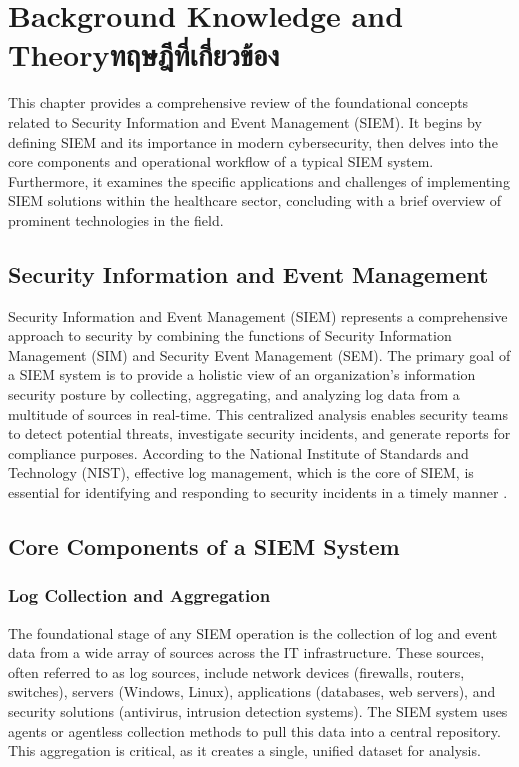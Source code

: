 \chapter{\ifenglish Background Knowledge and Theory\else ทฤษฎีที่เกี่ยวข้อง\fi}

This chapter provides a comprehensive review of the foundational concepts related to Security Information and Event Management (SIEM). It begins by defining SIEM and its importance in modern cybersecurity, then delves into the core components and operational workflow of a typical SIEM system. Furthermore, it examines the specific applications and challenges of implementing SIEM solutions within the healthcare sector, concluding with a brief overview of prominent technologies in the field.

\section{Security Information and Event Management}
\label{sec:what-is-siem}
Security Information and Event Management (SIEM) represents a comprehensive approach to security by combining the functions of Security Information Management (SIM) and Security Event Management (SEM). The primary goal of a SIEM system is to provide a holistic view of an organization's information security posture by collecting, aggregating, and analyzing log data from a multitude of sources in real-time. This centralized analysis enables security teams to detect potential threats, investigate security incidents, and generate reports for compliance purposes. According to the National Institute of Standards and Technology (NIST), effective log management, which is the core of SIEM, is essential for identifying and responding to security incidents in a timely manner \cite{nist_sp800-92}.


\section{Core Components of a SIEM System}
\subsection{Log Collection and Aggregation}
\label{sec:siem-components}
The foundational stage of any SIEM operation is the collection of log and event data from a wide array of sources across the IT infrastructure. These sources, often referred to as log sources, include network devices (firewalls, routers, switches), servers (Windows, Linux), applications (databases, web servers), and security solutions (antivirus, intrusion detection systems). The SIEM system uses agents or agentless collection methods to pull this data into a central repository. This aggregation is critical, as it creates a single, unified dataset for analysis.\cite{chapple_cybersecurity}

